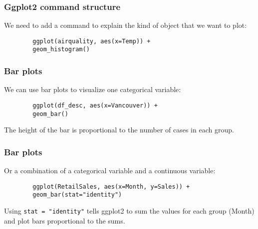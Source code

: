 \documentclass{beamer}
\begin{document}
	\begin{frame}[fragile]
		\frametitle{Ggplot2 command structure}

		We need to add a command to explain the kind of object that we want to plot:

		\vspace{2em}

		\begin{exampleblock}{}
		\begin{BVerbatim}
		ggplot(airquality, aes(x=Temp)) +
		geom_histogram()
		\end{BVerbatim}
		\end{exampleblock}{}
		
	\end{frame}

	\begin{frame}[fragile]
		\frametitle{Bar plots}

		We can use bar plots to visualize one categorical variable:

		\vspace{2em}

		\begin{exampleblock}{}
		\begin{BVerbatim}
		ggplot(df_desc, aes(x=Vancouver)) +
		geom_bar()
		\end{BVerbatim}
		\end{exampleblock}{}

		\vspace{2em}

		The height of the bar is proportional to the number of cases in each group.
		
	\end{frame}

	\begin{frame}[fragile]
		\frametitle{Bar plots}

		Or a combination of a categorical variable and a continuous variable:

		\vspace{2em}

		\begin{exampleblock}{}
		\begin{BVerbatim}
		ggplot(RetailSales, aes(x=Month, y=Sales)) + 
		geom_bar(stat="identity")
		\end{BVerbatim}
		\end{exampleblock}{}

		\vspace{2em}

		Using \verb|stat = "identity"| tells ggplot2 to sum the values for each group (Month) and plot bars proportional to the sums.
		
	\end{frame}
\end{document}
